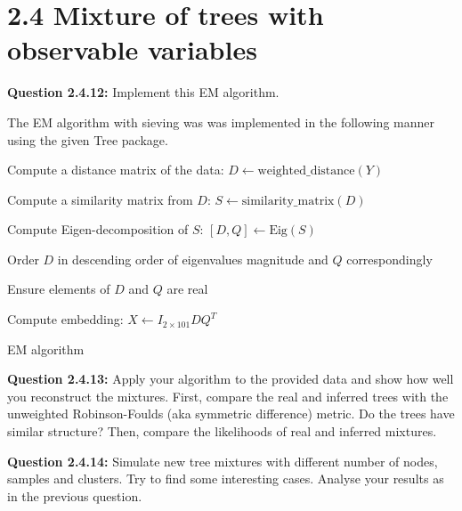 \section*{2.4 Mixture of trees with observable variables}

\begin{tcolorbox}
\textbf{Question 2.4.12:}
Implement this EM algorithm.
\end{tcolorbox}
The EM algorithm with sieving was was implemented in the following manner using the given Tree package.

\begin{algorithm}[H]
\SetAlgoLined
{}

  Compute a distance matrix of the data: $D \gets \text{weighted\_distance} (Y) $

  Compute a similarity matrix from $D$: $S \gets \text{similarity\_matrix} (D) $

  Compute Eigen-decomposition of $S$: $[D,Q] \gets \text{Eig}(S)$

  Order $D$ in descending order of eigenvalues magnitude and $Q$ correspondingly

  Ensure elements of $D$ and $Q$ are real

  Compute embedding: $X \gets I_{2\times 101}D Q^T$

  \caption{EM algorithm}
\end{algorithm}

\begin{tcolorbox}
\textbf{Question 2.4.13:}
Apply your algorithm to the provided data and show how well you reconstruct the mixtures. First, compare the real and inferred trees with the unweighted Robinson-Foulds (aka symmetric difference) metric. Do the trees have similar structure? Then, compare the likelihoods of real and inferred mixtures.
\end{tcolorbox}

\begin{tcolorbox}
\textbf{Question 2.4.14:}
Simulate new tree mixtures with different number of nodes, samples and clusters. Try to find some interesting cases. Analyse your results as in the previous question.
\end{tcolorbox}
